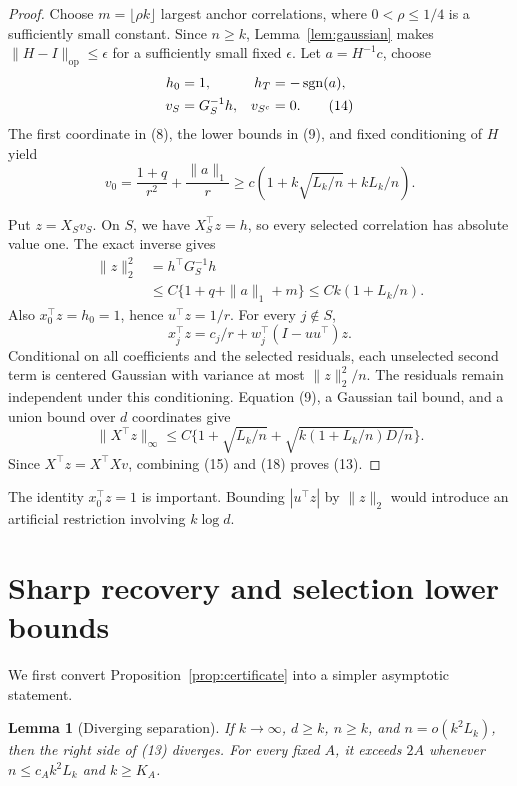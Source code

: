 \documentclass[twoside]{article}
\newtheorem{lemma}[theorem]{Lemma}
\newcommand{\sgn}{\operatorname{sgn}}
\begin{document}
\begin{proof}
Choose $m=\lfloor\rho k\rfloor$ largest anchor correlations, where
$0<\rho\leq1/4$ is a sufficiently small constant. Since $n\geq k$,
Lemma~\ref{lem:gaussian} makes $\|H-I\|_{\mathrm{op}}\leq\epsilon$ for a
sufficiently small fixed $\epsilon$. Let $a=H^{-1}c$, choose
\begin{align}
 h_0&=1,
 &h_T&=-\sgn(a),\notag\\
 v_S&=G_S^{-1}h,
 &v_{S^c}&=0.
 \tag{14}
\end{align}
The first coordinate in (8), the lower bounds in (9), and fixed conditioning of
$H$ yield
\[
 v_0=\frac{1+q}{r^2}+\frac{\|a\|_1}{r}
 \geq c(1+k\sqrt{L_k/n}+kL_k/n).
 \tag{15}
\]

Put $z=X_Sv_S$. On $S$, we have $X_S^\top z=h$, so every selected
correlation has absolute value one. The exact inverse gives
\begin{align*}
 \|z\|_2^2
 &=h^\top G_S^{-1}h\\
 &\leq C\{1+q+\|a\|_1+m\}
 \leq Ck(1+L_k/n).
 \tag{16}
\end{align*}
Also $x_0^\top z=h_0=1$, hence $u^\top z=1/r$. For every $j\notin S$,
\[
 x_j^\top z=c_j/r+w_j^\top(I-uu^\top)z.
 \tag{17}
\]
Conditional on all coefficients and the selected residuals, each unselected
second term is centered Gaussian with variance at most $\|z\|_2^2/n$.
The residuals remain independent under this conditioning. Equation (9), a
Gaussian tail bound, and a union bound over $d$ coordinates give
\[
 \|X^\top z\|_\infty
 \leq C\{1+\sqrt{L_k/n}+\sqrt{k(1+L_k/n)D/n}\}.
 \tag{18}
\]
Since $X^\top z=X^\top Xv$, combining (15) and (18) proves (13).
\end{proof}

The identity $x_0^\top z=1$ is important. Bounding $|u^\top z|$ by
$\|z\|_2$ would introduce an artificial restriction involving $k\log d$.

\section{Sharp recovery and selection lower bounds}
\label{sec:lower}

We first convert Proposition~\ref{prop:certificate} into a simpler asymptotic
statement.

\begin{lemma}[Diverging separation]
\label{lem:ratio}
If $k\to\infty$, $d\geq k$, $n\geq k$, and
$n=o(k^2L_k)$, then the right side of (13) diverges.
For every fixed $A$, it exceeds $2A$ whenever
$n\leq c_Ak^2L_k$ and $k\geq K_A$.
\end{lemma}
\end{document}
